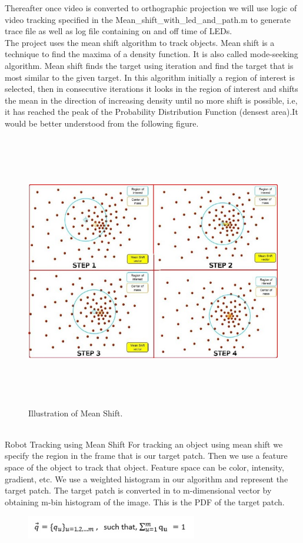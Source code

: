 \documentclass[a4paper,12pt,oneside]{book}
\begin{document}
    Thereafter once video is converted to orthographic projection we will use logic of video tracking specified in the  Mean\_shift\_with\_led\_and\_path.m to generate trace file as well as log file containing on and off time of LEDs.\\
    The project uses the mean shift algorithm to track objects.
    Mean shift is a technique to find the maxima of a density function. It is also called mode-seeking algorithm.
    Mean shift finds the target using iteration and find the target that is most similar to the given target. 
    In this algorithm initially a region of interest is selected, then in consecutive iterations it looks in the region of interest and shifts the mean in the direction of increasing density until no more shift is possible, i.e, it has reached the peak of the Probability Distribution Function (densest area).It would be better understood from the following figure.
    \begin{figure}[h!]
		\includegraphics[width=1\linewidth, height=12cm]{ROI.jpg}
		\centering
		\caption{Illustration of Mean Shift.}
	\end{figure}\\

    Robot Tracking using Mean Shift
    For tracking an object using mean shift we specify the region in the frame that is our target patch. Then we use a feature space of the object to track that object. Feature space can be color, intensity, gradient, etc. We use a weighted histogram in our algorithm and represent the target patch. The target patch is converted in to m-dimensional vector by obtaining m-bin histogram of the image. This is the PDF of the target patch. \\
    \begin{figure}[h!]
		\includegraphics[width=0.5\linewidth, height=1cm]{eq1.jpg}
	\end{figure}\\
    
\end{document}
